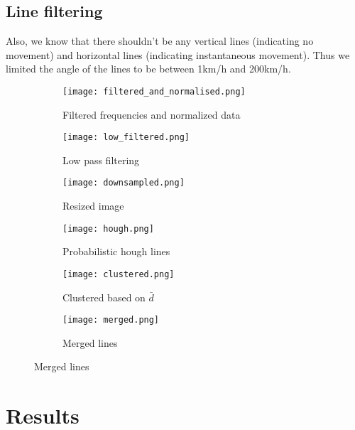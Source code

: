 \documentclass{article}
\begin{document}
\subsection{Line filtering}
Also, we know that there shouldn't be any vertical lines (indicating no movement) and horizontal lines (indicating instantaneous movement). Thus we limited the angle of the lines to be between 1km/h and 200km/h.

\afterpage{\clearpage}
\begin{figure}[p]
    \centering
    \begin{subfigure}{0.45\textwidth}
        \centering
        \texttt{[image: filtered\_and\_normalised.png]}
        \caption{Filtered frequencies and normalized data}
        \label{fig:freqnorm}
    \end{subfigure}
    \hfill
    \begin{subfigure}{0.45\textwidth}
        \centering
        \texttt{[image: low\_filtered.png]}
        \caption{Low pass filtering}
        \label{fig:lowfilt}
    \end{subfigure}

    \begin{subfigure}{0.45\textwidth}
        \centering
        \texttt{[image: downsampled.png]}
        \caption{Resized image}
        \label{fig:down}
    \end{subfigure}
    \hfill
    \begin{subfigure}{0.45\textwidth}
        \centering
        \texttt{[image: hough.png]}
        \caption{Probabilistic hough lines}
        \label{fig:houg}
    \end{subfigure}

    \begin{subfigure}{0.45\textwidth}
        \texttt{[image: clustered.png]}
        \caption{Clustered based on $\bar{d}$}
        \label{fig:cluster}
    \end{subfigure}
    \hfill
    \begin{subfigure}{0.45\textwidth}
        \centering
        \texttt{[image: merged.png]}
        \caption{Merged lines}
        \label{fig:merged}
    \end{subfigure}
\end{figure}

\newpage
\section{Results}
\end{document}

